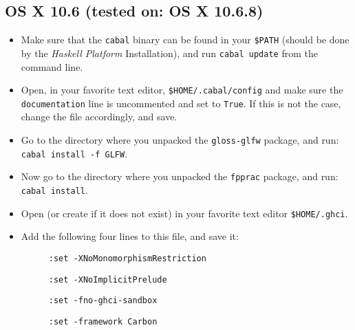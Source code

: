 \documentclass[]{article}
\begin{document}
\subsection{OS X 10.6 (tested on: OS X 10.6.8)}
\begin{itemize}
  \item Make sure that the \texttt{cabal} binary can be found in your \texttt{\$PATH} (should be done by the \emph{Haskell Platform} Installation), and run \texttt{cabal update} from the command line.
  \item Open, in your favorite text editor, \texttt{\$HOME/.cabal/config} and make sure the \texttt{documentation} line is uncommented and set to \texttt{True}. If this is not the case, change the file accordingly, and save.
  \item Go to the directory where you unpacked the \texttt{gloss-glfw} package, and run: \texttt{cabal install -f GLFW}.
  \item Now go to the directory where you unpacked the \texttt{fpprac} package, and run: \texttt{cabal install}.
  \item Open (or create if it does not exist) in your favorite text editor \texttt{\$HOME/.ghci}.
  \item Add the following four lines to this file, and save it:
  \begin{description}
    \item[] \texttt{:set -XNoMonomorphismRestriction}
    \item[] \texttt{:set -XNoImplicitPrelude}
    \item[] \texttt{:set -fno-ghci-sandbox}
    \item[] \texttt{:set -framework Carbon}
  \end{description}
\end{itemize}
\end{document}
